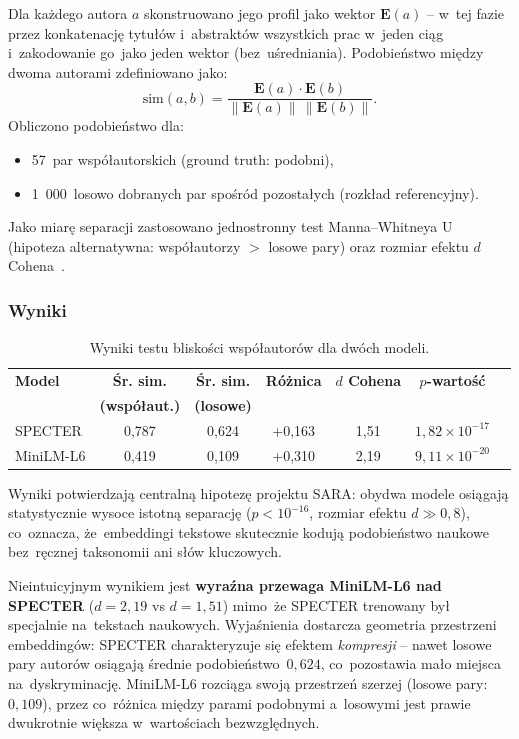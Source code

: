 Dla każdego autora $a$ skonstruowano jego profil jako wektor
$\mathbf{E}(a)$ -- w~tej fazie przez konkatenację tytułów i~abstraktów
wszystkich prac w~jeden ciąg i~zakodowanie go~jako jeden wektor
(bez~uśredniania).
Podobieństwo między dwoma autorami zdefiniowano jako:
\begin{equation}
    \mathrm{sim}(a,b)
    = \frac{\mathbf{E}(a)\cdot\mathbf{E}(b)}
           {\|\mathbf{E}(a)\|\,\|\mathbf{E}(b)\|}.
\end{equation}
Obliczono podobieństwo dla:
\begin{itemize}
    \item 57~par współautorskich (ground truth: podobni),
    \item 1~000~losowo dobranych par spośród pozostałych
          (rozkład referencyjny).
\end{itemize}
Jako miarę separacji zastosowano jednostronny test Manna--Whitneya U
(hipoteza alternatywna: współautorzy $>$ losowe pary)
oraz rozmiar efektu $d$ Cohena~\cite{cohen1988}.

\subsubsection{Wyniki}

\begin{table}[H]
\centering
\caption{Wyniki testu bliskości współautorów dla dwóch modeli.}
\label{tab:coauthor_test}
\begin{tabular}{lcccccc}
\toprule
\textbf{Model} &
\textbf{Śr. sim.} & \textbf{Śr. sim.} & \textbf{Różnica} &
\textbf{$d$ Cohena} & \textbf{$p$-wartość} \\
& \textbf{(współaut.)} & \textbf{(losowe)} & & & \\
\midrule
SPECTER   & 0{,}787 & 0{,}624 & +0{,}163 & 1{,}51 & $1{,}82 \times 10^{-17}$ \\
MiniLM-L6 & 0{,}419 & 0{,}109 & +0{,}310 & 2{,}19 & $9{,}11 \times 10^{-20}$ \\
\bottomrule
\end{tabular}
\end{table}

Wyniki potwierdzają centralną hipotezę projektu SARA:
obydwa modele osiągają statystycznie wysoce istotną separację
($p < 10^{-16}$, rozmiar efektu $d \gg 0{,}8$),
co~oznacza, że~embeddingi tekstowe skutecznie kodują podobieństwo
naukowe bez~ręcznej taksonomii ani słów kluczowych.

Nieintuicyjnym wynikiem jest \textbf{wyraźna przewaga MiniLM-L6
nad SPECTER} ($d = 2{,}19$ vs $d = 1{,}51$) mimo~że SPECTER
trenowany był specjalnie na~tekstach naukowych.
Wyjaśnienia dostarcza geometria przestrzeni embeddingów:
SPECTER charakteryzuje się efektem \emph{kompresji} --
nawet losowe pary autorów osiągają średnie podobieństwo~$0{,}624$,
co~pozostawia mało miejsca na~dyskryminację.
MiniLM-L6 rozciąga swoją przestrzeń szerzej (losowe pary: $0{,}109$),
przez co~różnica między parami podobnymi a~losowymi jest prawie
dwukrotnie większa w~wartościach bezwzględnych.

